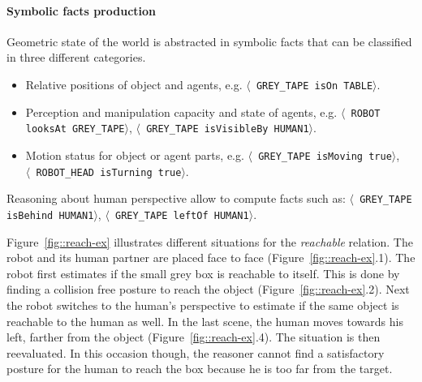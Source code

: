 \documentclass[preprint,5p]{elsarticle}
\newcommand{\stmt}[1]{{\footnotesize \tt $\langle$ #1\relax$\rangle$}}
\begin{document}
\paragraph{Symbolic facts production} 

Geometric state of the world is abstracted in symbolic facts that can
be classified in three different categories.

\begin {itemize}
\item Relative positions of object and agents, e.g.  \stmt{GREY\_TAPE
    isOn TABLE}.

\item Perception and manipulation capacity and state of agents,
  e.g. \stmt{ROBOT looksAt GREY\_TAPE}, \stmt{GREY\_TAPE isVisibleBy
    HUMAN1}.

\item Motion status for object or agent parts, e.g.  \stmt{GREY\_TAPE
    isMoving true},\\ \stmt{ROBOT\_HEAD isTurning true}.
\end {itemize} 

Reasoning about human perspective allow to compute facts such as:
\stmt{GREY\_TAPE isBehind HUMAN1}, \stmt{GREY\_TAPE leftOf
  HUMAN1}.

Figure~\ref{fig::reach-ex} illustrates different situations for the
\textit{reachable} relation. The robot and its human partner are placed face to
face (Figure~\ref{fig::reach-ex}.1).  The robot first estimates if the small
grey box is reachable to itself. This is done by finding a collision free
posture to reach the object (Figure~\ref{fig::reach-ex}.2). Next the robot
switches to the human's perspective to estimate if the same object is reachable
to the human as well.  In the last scene, the human moves towards his left,
farther from the object (Figure~\ref{fig::reach-ex}.4). The situation is then
reevaluated. In this occasion though, the reasoner cannot find a satisfactory
posture for the human to reach the box because he is too far from the target.
\end{document}
